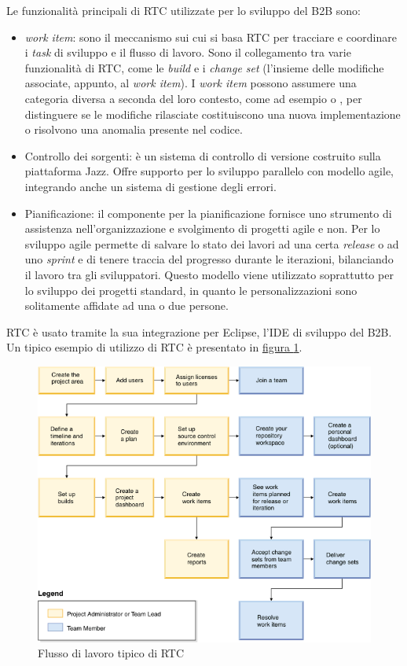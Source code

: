 Le funzionalità principali di RTC utilizzate per lo sviluppo del B2B sono:
\begin{itemize}
	\item \textit{work item}: sono il meccanismo sui cui si basa RTC per tracciare e coordinare i \textit{task} di sviluppo e il flusso di lavoro. Sono il collegamento tra varie funzionalità di RTC, come le \textit{build} e i \textit{change set} (l'insieme delle modifiche associate, appunto, al \textit{work item}). I \textit{work item} possono assumere una categoria diversa a seconda del loro contesto, come ad esempio  o , per distinguere se le modifiche rilasciate costituiscono una nuova implementazione o risolvono una anomalia presente nel codice.
	\item Controllo dei sorgenti: è un sistema di controllo di versione costruito sulla piattaforma Jazz. Offre supporto per lo sviluppo parallelo con modello agile, integrando anche un sistema di gestione degli errori.
	\item Pianificazione: il componente per la pianificazione fornisce uno strumento di assistenza nell'organizzazione e svolgimento di progetti agile e non. Per lo sviluppo agile permette di salvare lo stato dei lavori ad una certa \textit{release} o ad uno \textit{sprint} e di tenere traccia del progresso durante le iterazioni, bilanciando il lavoro tra gli sviluppatori. Questo modello viene utilizzato soprattutto per lo sviluppo dei progetti standard, in quanto le personalizzazioni sono solitamente affidate ad una o due persone.
\end{itemize}
RTC è usato tramite la sua integrazione per Eclipse, l'IDE di sviluppo del B2B. Un tipico esempio di utilizzo di RTC è presentato in \hyperref[fig:rtc]{figura \ref{fig:rtc}}\autocite{bib:rtcDoc}.
\begin{figure}
	\centering
	\includegraphics[width=14cm]{Immagini/rtc-task-flow.png}
	\caption{Flusso di lavoro tipico di RTC}
	\label{fig:rtc}
\end{figure}

